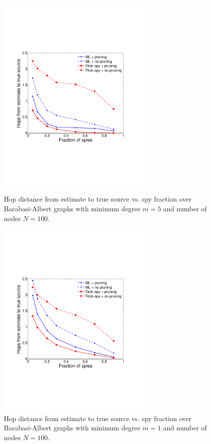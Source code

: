 \begin{figure}[ht]
  \begin{minipage}[b]{0.48\linewidth}
    \includegraphics[width=3in]{figures/ba_hops} 
    \caption{Hop distance from estimate to true source vs. spy fraction over Barabasi-Albert graphs with minimum degree $m=5$ and number of nodes $N=100$.} 
\label{fig:ba_hops}
  \end{minipage} 
  \hfill
  \begin{minipage}[b]{0.48\linewidth}
    \includegraphics[width=3in]{figures/ba_hops_p1} 
    \caption{Hop distance from estimate to true source vs. spy fraction over Barabasi-Albert graphs with minimum degree $m=1$ and number of nodes $N=100$.} 
\label{fig:ba_hops_p1}
  \end{minipage} 
\end{figure}

